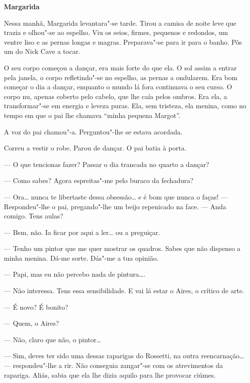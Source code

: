 \vspace*{1.8cm}
\noindent{}\textbf{Margarida}

\bigskip

Nessa manhã, Margarida levantara"-se tarde. Tirou a camisa de noite leve
que trazia e olhou"-se ao espelho. Viu os seios, firmes, pequenos e
redondos, um ventre liso e as pernas longas e magras. Preparava"-se para
ir para o banho. Pôs um  do Nick Cave a tocar.

O seu corpo começou a dançar, era mais forte do que ela. O sol assim a
entrar pela janela, o corpo refletindo"-se no espelho, as pernas a
ondularem. Era bom começar o dia a dançar, enquanto o mundo lá fora
continuava o seu curso. O corpo nu, apenas coberto pelo cabelo, que lhe
caía pelos ombros. Era ela, a transformar"-se em energia e leveza puras.
Ela, sem tristeza, ela menina, como no tempo em que o pai lhe chamava
``minha pequena Margot''.

A voz do pai chamou"-a. Perguntou"-lhe se estava acordada.

Correu a vestir o robe. Parou de dançar. O pai batia à porta.

--- O que tencionas fazer? Passar o dia trancada no quarto a dançar?

--- Como sabes? Agora espreitas"-me pelo buraco da fechadura?

--- Ora\ldots{} nunca te libertaste dessa obsessão\ldots{} e é bom que nunca o faças!
--- Respondeu"-lhe o pai, pregando"-lhe um beijo repenicado na face. --- Anda
comigo. Tens aulas?

--- Bem, não. Ia ficar por aqui a ler\ldots{} ou a preguiçar.

--- Tenho um pintor que me quer mostrar os quadros. Sabes que não dispenso
a minha menina. Dá-me sorte. Dás"-me a tua opinião.

--- Papi, mas eu não percebo nada de pintura\ldots{}.

--- Não interessa. Tens essa sensibilidade. E vai lá estar o Aires, o
crítico de arte.

--- É novo? É bonito?

--- Quem, o Aires?

--- Não, claro que não, o pintor\ldots{}

--- Sim, deves ter sido uma dessas raparigas do Rossetti, na outra
reencarnação\ldots{} --- respondeu"-lhe a rir. Não conseguia zangar"-se com os
atrevimentos da rapariga. Aliás, sabia que ela lhe dizia aquilo para lhe
provocar ciúmes.

